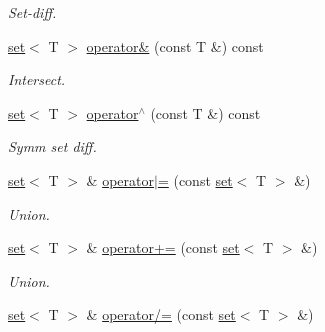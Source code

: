 \begin{DoxyCompactItemize}
\begin{DoxyCompactList}\small\item\em Set-\/diff. \end{DoxyCompactList}\item 
\hyperlink{classmerlin_1_1set}{set}$<$ T $>$ \hyperlink{classmerlin_1_1set_a5f97ef2bb5f230848ad018d86eb5a4b2}{operator\&} (const T \&) const \hypertarget{classmerlin_1_1set_a5f97ef2bb5f230848ad018d86eb5a4b2}{}\label{classmerlin_1_1set_a5f97ef2bb5f230848ad018d86eb5a4b2}

\begin{DoxyCompactList}\small\item\em Intersect. \end{DoxyCompactList}\item 
\hyperlink{classmerlin_1_1set}{set}$<$ T $>$ \hyperlink{classmerlin_1_1set_ac83716f6188e49336951c005ce2dc37d}{operator$^\wedge$} (const T \&) const \hypertarget{classmerlin_1_1set_ac83716f6188e49336951c005ce2dc37d}{}\label{classmerlin_1_1set_ac83716f6188e49336951c005ce2dc37d}

\begin{DoxyCompactList}\small\item\em Symm set diff. \end{DoxyCompactList}\item 
\hyperlink{classmerlin_1_1set}{set}$<$ T $>$ \& \hyperlink{classmerlin_1_1set_a61a296737e57dae6df4cfc2a76248e03}{operator$\vert$=} (const \hyperlink{classmerlin_1_1set}{set}$<$ T $>$ \&)\hypertarget{classmerlin_1_1set_a61a296737e57dae6df4cfc2a76248e03}{}\label{classmerlin_1_1set_a61a296737e57dae6df4cfc2a76248e03}

\begin{DoxyCompactList}\small\item\em Union. \end{DoxyCompactList}\item 
\hyperlink{classmerlin_1_1set}{set}$<$ T $>$ \& \hyperlink{classmerlin_1_1set_af383998860d966997045b18e9d801439}{operator+=} (const \hyperlink{classmerlin_1_1set}{set}$<$ T $>$ \&)\hypertarget{classmerlin_1_1set_af383998860d966997045b18e9d801439}{}\label{classmerlin_1_1set_af383998860d966997045b18e9d801439}

\begin{DoxyCompactList}\small\item\em Union. \end{DoxyCompactList}\item 
\hyperlink{classmerlin_1_1set}{set}$<$ T $>$ \& \hyperlink{classmerlin_1_1set_a5bb76573ee049dd6003155c87f468a80}{operator/=} (const \hyperlink{classmerlin_1_1set}{set}$<$ T $>$ \&)\hypertarget{classmerlin_1_1set_a5bb76573ee049dd6003155c87f468a80}{}\label{classmerlin_1_1set_a5bb76573ee049dd6003155c87f468a80}


\end{DoxyCompactItemize}
